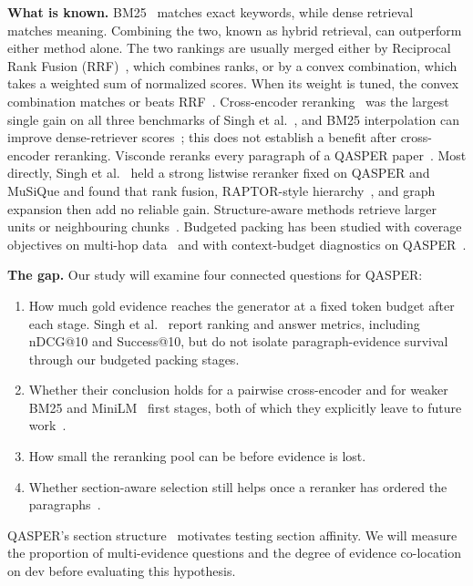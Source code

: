 \documentclass[sigconf, nonacm]{acmart}
\newcommand{\minihead}[1]{{\noindent\textbf{#1.} }}
\begin{document}
\minihead{What is known} BM25~\cite{robertson2009bm25} matches exact keywords, while dense retrieval~\cite{karpukhin2020dpr} matches meaning. Combining the two, known as hybrid retrieval, can outperform either method alone. The two rankings are usually merged either by Reciprocal Rank Fusion (RRF)~\cite{cormack2009rrf}, which combines ranks, or by a convex combination, which takes a weighted sum of normalized scores. When its weight is tuned, the convex combination matches or beats RRF~\cite{bruch2023fusion}. Cross-encoder reranking~\cite{nogueira2019bert} was the largest single gain on all three benchmarks of Singh et al.~\cite{singh2026beyond}, and BM25 interpolation can improve dense-retriever scores~\cite{wang2021interpolate}; this does not establish a benefit after cross-encoder reranking. Visconde reranks every paragraph of a QASPER paper~\cite{pereira2023visconde}. Most directly, Singh et al.~\cite{singh2026beyond} held a strong listwise reranker fixed on QASPER and MuSiQue and found that rank fusion, RAPTOR-style hierarchy~\cite{sarthi2024raptor}, and graph expansion then add no reliable gain. Structure-aware methods retrieve larger units or neighbouring chunks~\cite{jiang2024longrag, llamaindexautomerge, langlois2026scar}. Budgeted packing has been studied with coverage objectives on multi-hop data~\cite{bala2026recall} and with context-budget diagnostics on QASPER~\cite{kim2026evidence}.

\minihead{The gap} Our study will examine four connected questions for QASPER:
\begin{enumerate}[leftmargin=*,nosep]
  \item How much gold evidence reaches the generator at a fixed token budget after each stage. Singh et al.~\cite{singh2026beyond} report ranking and answer metrics, including nDCG@10 and Success@10, but do not isolate paragraph-evidence survival through our budgeted packing stages.
  \item Whether their conclusion holds for a pairwise cross-encoder and for weaker BM25 and MiniLM~\cite{minilmcard} first stages, both of which they explicitly leave to future work~\cite{singh2026beyond}.
  \item How small the reranking pool can be before evidence is lost.
  \item Whether section-aware selection still helps once a reranker has ordered the paragraphs~\cite{llamaindexautomerge, langlois2026scar}.
\end{enumerate}
QASPER's section structure~\cite{dasigi2021qasper} motivates testing section affinity. We will measure the proportion of multi-evidence questions and the degree of evidence co-location on dev before evaluating this hypothesis.
\end{document}
